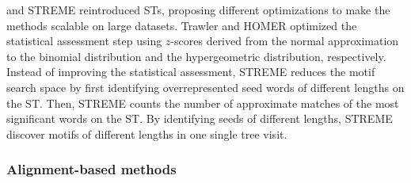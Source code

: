\documentclass[a4paper, titlepage, openright]{book}
\begin{document}
and STREME \citep{ettwiller2007trawler,heinz2010simple,bailey2021streme} reintroduced STs, proposing different optimizations to make the methods scalable on large datasets. Trawler and HOMER optimized the statistical assessment step using $z$-scores derived from the normal approximation to the binomial distribution and the hypergeometric distribution, respectively. Instead of improving the statistical assessment, STREME reduces the motif search space by first identifying overrepresented seed words of different lengths on the ST. Then, STREME counts the number of approximate matches of the most significant words on the ST. By identifying seeds of different lengths, STREME discover motifs of different lengths in one single tree visit.
\subsubsection{Alignment-based methods}
\end{document}
